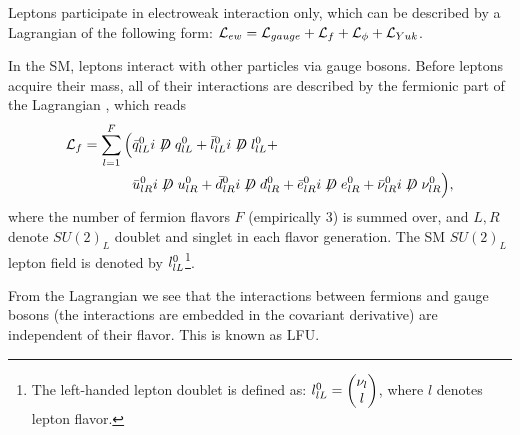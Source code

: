 Leptons participate in electroweak interaction only,
which can be described by a Lagrangian of the following form:
$\mathcal{L}_{ew} = \mathcal{L}_{gauge} + \mathcal{L}_{f} + \mathcal{L}_{\phi} + \mathcal{L}_{Yuk}$.

In the SM, leptons interact with other particles via gauge bosons.
Before leptons acquire their mass, all of their interactions are described by
the fermionic part of the Lagrangian , which
reads \cite{Langacker:2010zza}
\begin{align}
    \Lden{f} = \sum_{l = 1}^F \Big(
        & \bar{\spin{q}}^0_{lL} i \fsl{D} \spin{q}^0_{lL} +
          \bar{\spin{l}}^0_{lL} i \fsl{D} \spin{l}^0_{lL} + \nonumber \\
        & \bar{u}^0_{lR} i \fsl{D} u^0_{lR} +
          \bar{d}^0_{lR} i \fsl{D} d^0_{lR} +
          \bar{e}^0_{lR} i \fsl{D} e^0_{lR} +
          \bar{\nu}^0_{lR} i \fsl{D} \nu^0_{lR}
    \Big),
\end{align}
where the number of fermion flavors $F$ (empirically 3) is summed over, and
$L,R$ denote $SU(2)_L$ doublet and singlet in each flavor generation.
The SM $SU(2)_L$ lepton field is denoted by $l^0_{lL}$\footnote{
    The left-handed lepton doublet is defined as:
    $l^0_{lL} = \begin{pmatrix} \nu_l \\ l \end{pmatrix}$,
    where $l$ denotes lepton flavor.
}.

From the Lagrangian we see that the interactions between fermions and gauge
bosons (the interactions are embedded in the  covariant derivative) are
independent of their flavor.
This is known as LFU.
